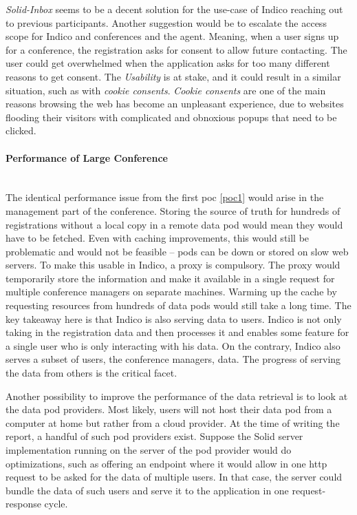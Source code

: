 \textit{Solid-Inbox} seems to be a decent solution for the use-case of Indico reaching out to previous participants. Another suggestion would be to escalate the access scope for Indico and conferences and the agent. Meaning, when a user signs up for a conference, the registration asks for consent to allow future contacting. The user could get overwhelmed when the application asks for too many different reasons to get consent. The \textit{Usability} is at stake, and it could result in a similar situation, such as with \textit{cookie consents}. \textit{Cookie consents} are one of the main reasons browsing the web has become an unpleasant experience, due to websites flooding their visitors with complicated and obnoxious popups that need to be clicked.
\vspace{0.5cm}
\paragraph{Performance of Large Conference}\mbox{}\\

The identical performance issue from the first \gls{poc} \ref{poc1} would arise in the management part of the conference. Storing the source of truth for hundreds of registrations without a local copy in a remote data pod would mean they would have to be fetched. Even with caching improvements, this would still be problematic and would not be feasible -- pods can be down or stored on slow web servers. To make this usable in Indico, a proxy is compulsory. The proxy would temporarily store the information and make it available in a single request for multiple conference managers on separate machines. Warming up the cache by requesting resources from hundreds of data pods would still take a long time. The key takeaway here is that Indico is also serving data to users. Indico is not only taking in the registration data and then processes it and enables some feature for a single user who is only interacting with his data. On the contrary, Indico also serves a subset of users, the conference managers, data. The progress of serving the data from others is the critical facet.

Another possibility to improve the performance of the data retrieval is to look at the data pod providers. Most likely, users will not host their data pod from a computer at home but rather from a cloud provider. At the time of writing the report, a handful of such pod providers exist. Suppose the Solid server implementation running on the server of the pod provider would do optimizations, such as offering an endpoint where it would allow in one \gls{http} request to be asked for the data of multiple users. In that case, the server could bundle the data of such users and serve it to the application in one request-response cycle.
\vspace{0.5cm}
